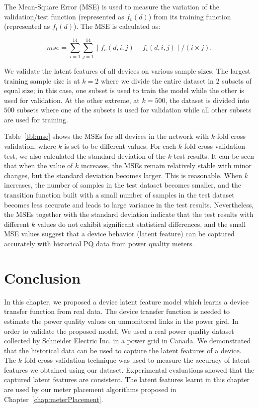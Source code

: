 The Mean-Square Error (MSE) is used to measure the variation of the validation/test function (represented as $f_v(d)$) from its training function (represented as $f_t(d)$).  The MSE is calculated as: 

\vspace{0.5cm}
\[mse = \sum_{i=1}^{14} \sum_{j=1}^{14} \mid f_v(d, i, j) - f_t(d, i, j) \mid / (i \times j).\]
\vspace{0.5cm}

We validate the latent features of all devices on various sample sizes. The largest training sample size is at $k=2$ where we divide the entire dataset in $2$ subsets of equal size; in this case, one subset is used to train the model while the other is used for validation. At the other extreme, at $k=500$, the dataset is divided into $500$ subsets where one of the subsets is used for validation while all other subsets are used for training.

Table~\ref{tbl:mse} shows the MSEs for all devices in the network with $k$-fold cross validation, where $k$ is set to be different values. For each $k$-fold cross validation test, we also calculated the standard deviation of the $k$ test results. It can be seen that when the value of $k$ increases, the MSEs remain relatively stable with minor changes, but the standard deviation becomes larger. This is reasonable. When $k$ increases, the number of samples in the test dataset becomes smaller, and the transition function built with a small number of samples in the test dataset becomes less accurate and leads to large variance in the test results. Nevertheless, the MSEs together with the standard deviation indicate that the test results with different $k$ values do not exhibit significant statistical differences, and the small MSE values suggest that a device behavior (latent feature) can be captured accurately with historical PQ data from power quality meters.

\vspace{0.5cm}
\section{Conclusion}
In this chapter, we proposed a device latent feature model which learns a device transfer function from real data. The device transfer function is needed to estimate the power quality values on unmonitored links in the power gird. In order to validate the proposed model, We used a real power quality dataset collected by Schneider Electric Inc. in a power grid in Canada. We demonstrated that the historical data can be used to capture the latent features of a device. The $k$-fold cross-validation technique was used to measure the accuracy of latent features we obtained using our dataset. Experimental evaluations showed that the captured latent features are consistent. The latent features learnt in this chapter are used by our meter placement algorithms proposed in Chapter~\ref{chap:meterPlacement}.